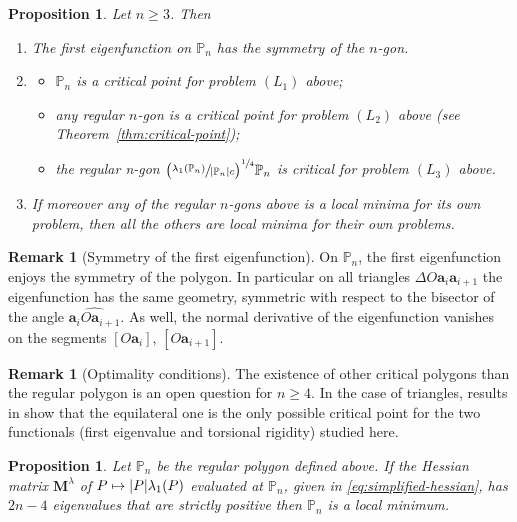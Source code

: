 \documentclass[JEP,XML,SOM,Unicode,ThmDefs,NoFloatCountersInSection,published]{cedram}
\def\mto{\mathchoice{\longmapsto}{\mapsto}{\mapsto}{\mapsto}}
\theoremstyle{plain}
\newtheorem{propo}[thm]{Proposition}
\theoremstyle{definition}
\newtheorem{rem}[thm]{Remark}
\newcommand{\bo}[1]{{\boldsymbol#1}}
\def\Pp{{\mathbb{P}_n}}
\begin{document}
\begin{propo}
Let $n \geq 3$. Then
\begin{enumerate}
\item The first eigenfunction on $\Pp$ has the symmetry of the $n$-gon.
\item\mbox{}\vspace*{-1.2\baselineskip}
\begin{itemize}
\item $\Pp$ is a critical point for problem $(L_1)$ above;
\item any regular $n$-gon is a critical point for problem $(L_2)$ above (see Theorem~\ref{thm:critical-point});
\item the regular n-gon $\bigl(\sfrac{\lambda_1(\Pp)}{|\Pp| c}\bigr)^{\sfrac14} \Pp$ is critical for problem $(L_3)$ above.
\end{itemize}
\item
If moreover any of the regular $n$-gons above is a local minima for its own problem, then all the others are local minima for their own problems.
\end{enumerate}
\label{thm:criticality}
\end{propo}

\begin{rem}[Symmetry of the first eigenfunction]
On $\Pp$, the first eigenfunction enjoys the symmetry of the polygon. In particular on all triangles $\Delta O\bo a_i \bo a_{i+1}$ the eigenfunction has the same geometry, symmetric with respect to the bisector of the angle $\widehat {\bo a_iO \bo a_{i+1}}$. As well, the normal derivative of the eigenfunction vanishes on the segments $[O\bo a_i]$, $[O\bo a_{i+1}]$.
\label{rem:symm-eigenfunction}
\end{rem}

\begin{rem}[Optimality conditions]
The existence of other critical polygons than the regular polygon is an open question for $n \geq 4$. In the case of triangles, results in \cite{FragalaVelichkov19} show that the equilateral one is the only possible critical point for the two functionals (first eigenvalue and torsional rigidity) studied here.
\end{rem}

\begin{propo}
Let $\Pp$ be the regular polygon defined above. If the Hessian matrix $\bo M^\lambda$ of $P\mto |P|\lambda_1(P)$ evaluated at $\Pp$, given in \eqref{eq:simplified-hessian}, has $2n-4$ eigenvalues that are strictly positive then $\Pp$ is a local minimum.
\label{prop:justification-2n-4}
\end{propo}
\end{document}
